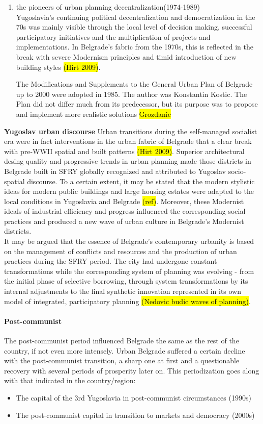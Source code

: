 \documentclass[11pt]{report}
\begin{document}
\begin{enumerate}
\item the pioneers of urban planning decentralization(1974-1989)
\\
Yugoslavia’s continuing political decentralization and democratization in the 70s was mainly visible through the local level of decision making, successful participatory initiatives and the multiplication of projects and implementations. In Belgrade’s fabric from the 1970s, this is reﬂected in the break with severe Modernism principles and timid introduction of new building styles \hl{(Hirt 2009)}.

The Modifications  and  Supplements  to  the  General  Urban  Plan  of  Belgrade  up  to 2000 were adopted in 1985. The author was Konstantin Kostic. The Plan did not differ much from its predecessor, but its purpose was to propose and implement more realistic solutions \hl{Grozdanic}
\end{enumerate}
 
\textbf{Yugoslav urban discourse}
Urban transitions during the self-managed socialist era were in fact interventions in the urban fabric of Belgrade that a clear break with pre-WWII spatial and built patterns \hl{(Hirt 2009)}. Superior architectural desing quality and progressive trends in urban planning made those districts in Belgrade built in SFRY globally recognized and attributed to Yugoslav socio-spatial discourse. To a certain extent, it may be stated that the modern stylistic ideas for modern  public  buildings  and  large  housing  estates were adapted to the local conditions in Yugoslavia and Belgrade \hl{(ref)}. Moreover, these Modernist ideals of industrial efficiency and progress influenced the corresponding social practices and produced a new wave of urban culture in Belgrade’s Modernist districts.
\\
It may be argued that the essence of Belgrade's contemporary urbanity is based on the management of conflicts and resources and the production of urban practices during the SFRY period. The city had undergone constant transformations while the corresponding system of planning was evolving - from the initial phase of selective borrowing, through system transformations by its internal adjustments to the final synthetic innovation represented in its own model of integrated, participatory planning \hl{(Nedovic budic waves of planning)}.

\paragraph{Post-communist}
The post-communist period influenced Belgrade the same as the rest of the country, if not even more intensely. Urban Belgrade suffered a certain decline with the post-communist transition, a sharp one at first and a questionable recovery with several periods of prosperity later on. This periodization goes along with that indicated in the country/region:
\begin{itemize}
\item The capital of the 3rd Yugoslavia in post-communist circumstances (1990s)
\item The post-communist capital in transition to markets and democracy (2000s)
\end{itemize}
\end{document}
